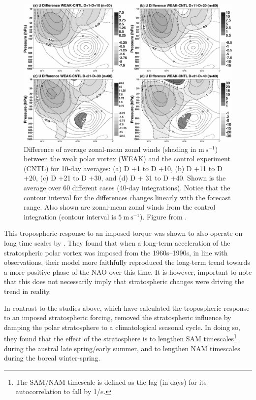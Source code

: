 \begin{figure}
 \centering
 \noindent\includegraphics[width=\textwidth]{figures/chapter-intro/Jung_Barkmeijer.pdf}
 \caption[Numerical simulation results from \citet{Jung2006}]{Difference of
   average zonal-mean zonal winds (shading in $\mathrm{m~s^{-1}}$) between the
   weak polar vortex (WEAK) and the control experiment (CNTL) for 10-day
   averages: (a) D +1 to D +10, (b) D +11 to D +20, (c) D +21 to D +30, and (d)
   D + 31 to D +40. Shown is the average over 60 different cases (40-day
   integrations). Notice that the contour interval for the differences changes
   linearly with the forecast range. Also shown are zonal-mean zonal winds from
   the control integration (contour interval is $\mathrm{5~m~s^{-1}}$). Figure
   from \citet{Jung2006}.}
 \label{fig:jung_barkmeijer}
\end{figure}

This tropospheric response to an imposed torque was shown to also operate on
long time scales by \citet{Scaife2005}. They found that when a long-term
acceleration of the stratospheric polar vortex was imposed from the
1960s--1990s, in line with observations, their model more faithfully reproduced
the long-term trend towards a more positive phase of the NAO over this time. It
is however, important to note that this does not necessarily imply that
stratospheric changes were driving the trend in reality.

In contrast to the studies above, which have calculated the tropospheric
response to an imposed stratospheric forcing, \citet{Simpson2011} removed the
stratospheric influence by damping the polar stratosphere to a climatological
seasonal cycle. In doing so, they found that the effect of the stratosphere is
to lengthen SAM timescales\footnote{The SAM/NAM timescale is defined as the lag
  (in days) for its autocorrelation to fall by 1/$e$.} during the austral late
spring/early summer, and to lengthen NAM timescales during the boreal
winter-spring.

